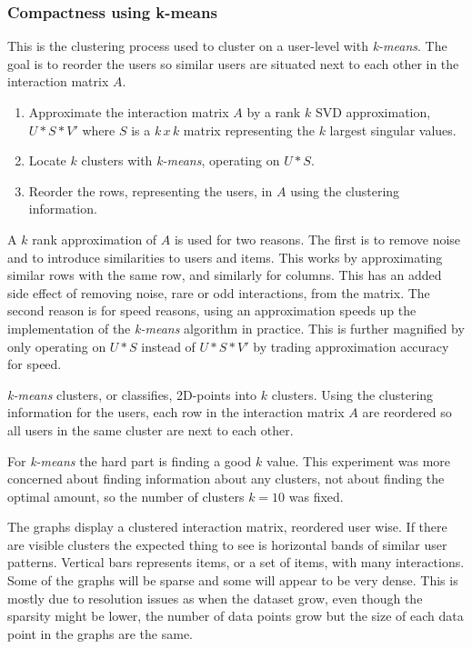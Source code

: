 
\subsubsection{Compactness using k-means}

This is the clustering process used to cluster on a user-level with \textit{k-means}. The goal is to reorder the users so similar users are situated next to each other in the interaction matrix $A$.

\begin{enumerate}
    \item Approximate the interaction matrix $A$ by a rank $k$ SVD approximation, $U * S * V'$ where $S$ is a $k\,x\,k$ matrix representing the $k$ largest singular values.
    \item Locate $k$ clusters with \textit{k-means}, operating on $U * S$.
    \item Reorder the rows, representing the users, in $A$ using the clustering information.
\end{enumerate}

A $k$ rank approximation of $A$ is used for two reasons. The first is to remove noise and to introduce similarities to users and items. This works by approximating similar rows with the same row, and similarly for columns. This has an added side effect of removing noise, rare or odd interactions, from the matrix. The second reason is for speed reasons, using an approximation speeds up the implementation of the \textit{k-means} algorithm in practice. This is further magnified by only operating on $U * S$ instead of $U * S * V'$ by trading approximation accuracy for speed.

\textit{k-means} clusters, or classifies, 2D-points into $k$ clusters. Using the clustering information for the users, each row in the interaction matrix $A$ are reordered so all users in the same cluster are next to each other.

For \textit{k-means} the hard part is finding a good $k$ value. This experiment was more concerned about finding information about any clusters, not about finding the optimal amount, so the number of clusters $k = 10$ was fixed.

The graphs display a clustered interaction matrix, reordered user wise.
If there are visible clusters the expected thing to see is horizontal bands of similar user patterns. Vertical bars represents items, or a set of items, with many interactions.  Some of the graphs will be sparse and some will appear to be very dense. This is mostly due to resolution issues as when the dataset grow, even though the sparsity might be lower, the number of data points grow but the size of each data point in the graphs are the same.


